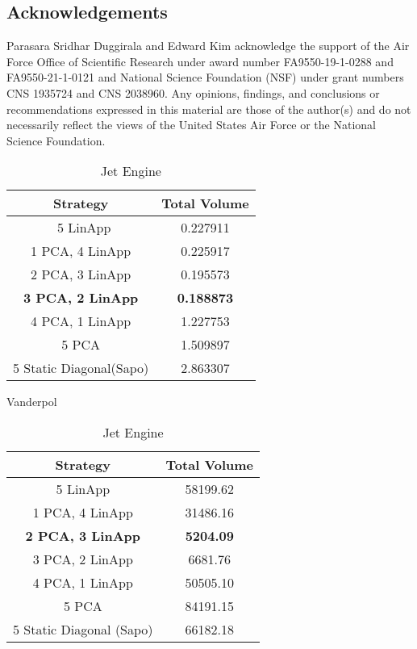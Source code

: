 \subsection{Acknowledgements}
Parasara Sridhar Duggirala and Edward Kim acknowledge the support of the Air Force Office of Scientific Research under award number FA9550-19-1-0288 and FA9550-21-1-0121 and National Science Foundation (NSF) under grant numbers CNS 1935724 and CNS 2038960. Any opinions, findings, and conclusions or recommendations expressed in this material are those of the author(s) and do not necessarily reflect the views of the United States Air Force or the National Science Foundation.

\begin{table}[h!]
\hspace{1em}
\begin{subtable}[h]{0.45\textwidth}
     \centering
     \begin{tabular}{|c|c|}
     \hline
     Strategy & Total  Volume \\
     \hline\
     5 LinApp & 0.227911 \\
     \hline
     1 PCA, 4 LinApp& 0.225917 \\
     \hline
     2 PCA, 3 LinApp & 0.195573 \\
     \hline
     {\bf 3 PCA, 2 LinApp} & {\bf 0.188873} \\
     \hline
     4 PCA, 1 LinApp & 1.227753\\
     \hline
     5 PCA & 1.509897 \\
     \hline
     5 Static Diagonal(Sapo) & 2.863307  \\
     \hline
    \end{tabular}
    \caption{Vanderpol}
    \label{tab:vdpvol}
 \end{subtable}\hspace{1em}
 \begin{subtable}[h]{0.45\textwidth}
      \centering
      \begin{tabular}{|c|c|}
      \hline
      Strategy & Total  Volume \\
      \hline
      5 LinApp & 58199.62 \\
      \hline
      1 PCA, 4 LinApp & 31486.16 \\
      \hline
      {\bf 2 PCA, 3 LinApp} & {\bf 5204.09}\\
      \hline
      3 PCA, 2 LinApp & 6681.76 \\
      \hline
      4 PCA, 1 LinApp& 50505.10 \\
      \hline
      5 PCA  & 84191.15 \\
      \hline
      5 Static Diagonal (Sapo) & 66182.18  \\
      \hline
     \end{tabular}
     \caption{Jet Engine}
     \label{tab:enginevol}
  \end{subtable}


\end{table}
